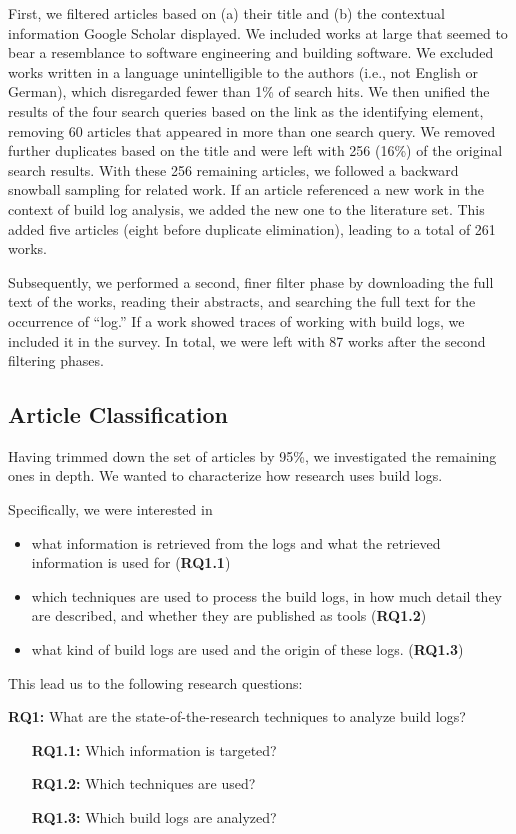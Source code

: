 First, we filtered articles based on (a) their title and (b) the
contextual information Google Scholar displayed.
We included works at large that seemed to bear a resemblance to software
engineering and building software.
We excluded works written in a language unintelligible to the authors
(i.e., not English or German), which disregarded fewer than 1\% of search
hits.
We then unified
the results of the four search queries based on the link as the
identifying element, removing 60 articles that appeared in more than
one search query.
We removed further duplicates based on the title and were
left with 256 (16\%) of the original search results.
With these 256 remaining articles, we followed a backward snowball
sampling for related work.
If an article referenced a new work in the context
of build log analysis, we added the new one to the literature set.
This added five articles (eight before
duplicate elimination), leading to a total of 261
works.


Subsequently, we performed a second, finer filter phase by downloading the
full text of the works, reading their abstracts, and searching the
full text
for the occurrence of ``log.''
If a work showed traces of
working with build logs, we included it in the survey.
In total, we
were left with 87 works after the second filtering phases.

\subsection{Article Classification}
Having trimmed down the set of articles by 95\%, we investigated the
remaining ones in depth.
We wanted to characterize how research uses build logs.

Specifically, we were interested in
\begin{itemize}
  \item what information is retrieved from the logs and
  what the retrieved information is used for (\textbf{RQ1.1})
  \item which techniques are used to process the build logs,
  in how much detail they are described, and whether they are published
  as tools (\textbf{RQ1.2})
  \item what kind of build logs are used and the origin of these
  logs.
(\textbf{RQ1.3})
\end{itemize}

This lead us to the following research questions:
\begin{simplebox}[attach boxed title to top center={yshift=-6mm}]
{\textbf{RQ1:} What are the state-of-the-research
techniques to analyze build logs?}
\begin{itemize}[leftmargin=2cm]
  \item[\textbf{RQ1.1:}] Which information is targeted?
  \item[\textbf{RQ1.2:}] Which techniques are used?
  \item[\textbf{RQ1.3:}] Which build logs are analyzed?
\end{itemize}
\end{simplebox}

